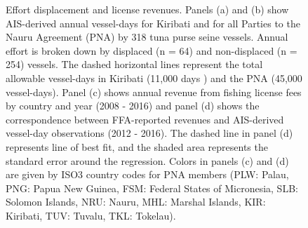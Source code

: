 \documentclass[12pt]{article}
\begin{document}
\begin{figure}[htbp]
\centering
\caption{\label{fig:empirical}Effort displacement and license revenues. Panels (a) and (b) show AIS-derived annual vessel-days for Kiribati and for all Parties to the Nauru Agreement (PNA) by 318 tuna purse seine vessels. Annual effort is broken down by displaced (n = 64) and non-displaced (n = 254) vessels. The dashed horizontal lines represent the total allowable vessel-days in Kiribati (11,000 days \cite{yeeting2018stabilising}) and the PNA (45,000 vessel-days). Panel (c) shows annual revenue from fishing license fees by country and year (2008 - 2016) and panel (d) shows the correspondence between FFA-reported revenues and AIS-derived vessel-day observations (2012 - 2016). The dashed line in panel (d) represents line of best fit, and the shaded area represents the standard error around the regression. Colors in panels (c) and (d) are given by ISO3 country codes for PNA members (PLW: Palau, PNG: Papua New Guinea, FSM: Federal States of Micronesia, SLB: Solomon Islands, NRU: Nauru, MHL: Marshal Islands, KIR: Kiribati, TUV: Tuvalu, TKL: Tokelau).}
\end{figure}
\end{document}
